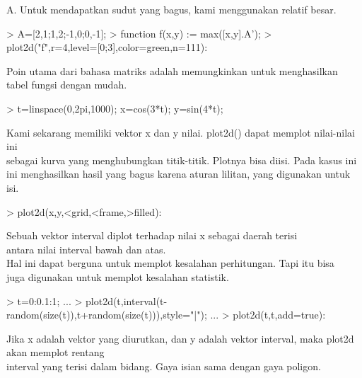 \documentclass{report}
\begin{document}
\begin{eulernotebook}
\begin{eulercomment}
\begin{eulercomment}
\begin{eulercomment}
\begin{eulercomment}
\begin{eulercomment}
A. Untuk mendapatkan sudut yang bagus, kami menggunakan relatif besar.
\end{eulercomment}
\begin{eulerprompt}
> A=[2,1;1,2;-1,0;0,-1];
> function f(x,y) := max([x,y].A');
> plot2d("f",r=4,level=[0;3],color=green,n=111):
\end{eulerprompt}
\begin{eulercomment}
Poin utama dari bahasa matriks adalah memungkinkan untuk menghasilkan
tabel fungsi dengan mudah.
\end{eulercomment}
\begin{eulerprompt}
> t=linspace(0,2pi,1000); x=cos(3*t); y=sin(4*t);
\end{eulerprompt}
\begin{eulercomment}
Kami sekarang memiliki vektor x dan y nilai. plot2d() dapat memplot
nilai-nilai ini\\
sebagai kurva yang menghubungkan titik-titik. Plotnya bisa diisi. Pada
kasus ini\\
ini menghasilkan hasil yang bagus karena aturan lilitan, yang
digunakan untuk\\
isi.
\end{eulercomment}
\begin{eulerprompt}
> plot2d(x,y,<grid,<frame,>filled):
\end{eulerprompt}
\begin{eulercomment}
Sebuah vektor interval diplot terhadap nilai x sebagai daerah terisi\\
antara nilai interval bawah dan atas.\\
Hal ini dapat berguna untuk memplot kesalahan perhitungan. Tapi itu
bisa\\
juga digunakan untuk memplot kesalahan statistik.
\end{eulercomment}
\begin{eulerprompt}
> t=0:0.1:1; ...
> plot2d(t,interval(t-random(size(t)),t+random(size(t))),style="|");  ...
> plot2d(t,t,add=true):
\end{eulerprompt}
\begin{eulercomment}
Jika x adalah vektor yang diurutkan, dan y adalah vektor interval,
maka plot2d akan memplot rentang\\
interval yang terisi dalam bidang. Gaya isian sama dengan gaya
poligon.
\end{eulercomment}

\end{eulercomment}
\end{eulercomment}
\end{eulercomment}
\end{eulercomment}
\end{eulernotebook}
\end{document}
